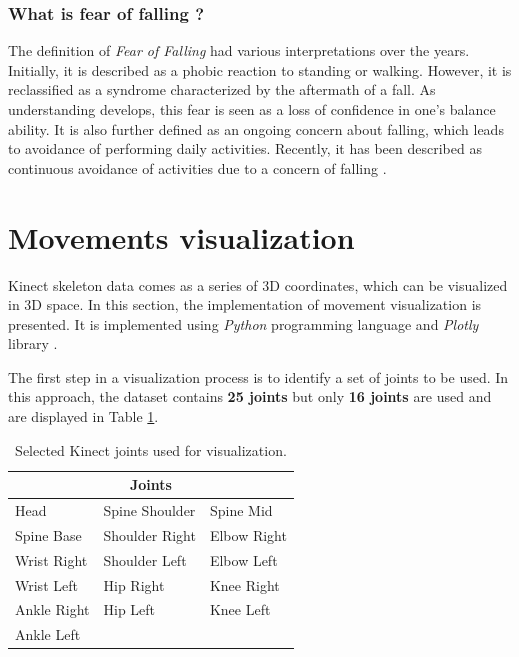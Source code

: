         \subsubsection{What is fear of falling ?}
        
            The definition of \textit{Fear of Falling} had various interpretations over the years. Initially, it is described as a phobic reaction to standing or walking. However, it is reclassified as a syndrome characterized by the aftermath of a fall. As understanding develops, this fear is seen as a loss of confidence in one's balance ability. It is also further defined as an ongoing concern about falling, which leads to avoidance of performing daily activities. Recently, it has been described as continuous avoidance of activities due to a concern of falling \cite{jung_fear_2008}.
    
    \section{Movements visualization} \label{sec:movements_visualization}
        
        Kinect skeleton data comes as a series of 3D coordinates, which can be visualized in 3D space. In this section, the implementation of movement visualization is presented. It is implemented using \textit{Python} programming language and \textit{Plotly} library \cite{plotly}.

        The first step in a visualization process is to identify a set of joints to be used. In this approach, the dataset contains \textbf{25 joints} but only \textbf{16 joints} are used and are displayed in Table \ref{tab:joints_select}. 

        \begin{table}[H]
            \centering
            \begin{tabularx}{1.0\textwidth}{XXX}
                \toprule
                \multicolumn{3}{c}{\textbf{Joints}} \\
                \midrule
                Head & Spine Shoulder & Spine Mid \\
                Spine Base & Shoulder Right & Elbow Right \\
                Wrist Right & Shoulder Left & Elbow Left \\
                Wrist Left & Hip Right & Knee Right \\
                Ankle Right & Hip Left & Knee Left \\
                Ankle Left & & \\
                \bottomrule
            \end{tabularx}
            \caption{Selected Kinect joints used for visualization.}
            \label{tab:joints_select}
        \end{table}
        

